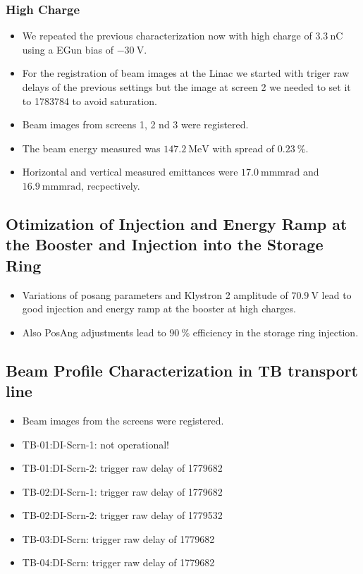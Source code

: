 \documentclass{article}
\begin{document}
\subsubsection{High Charge}
\begin{itemize}
\item We repeated the previous characterization now with high charge of $\SI{3.3}{\nano\coulomb}$ using a EGun bias of $\SI{-30}{\volt}$. 
\item For the registration of beam images at the Linac we started with triger raw delays of the previous settings but the image at screen 2 we needed to set it to 1783784 to avoid saturation.
\item Beam images from screens 1, 2 nd 3 were registered.
\item The beam energy measured was $\SI{147.2}{\mega \electronvolt}$ with spread of $\SI{0.23}{\percent}$.
\item Horizontal and vertical measured emittances were $\SI{17.0}{\milli\meter \milli\radian}$ and $\SI{16.9}{\milli\meter \milli\radian}$, recpectively.
\end{itemize}


\subsection{Otimization of Injection and Energy Ramp at the Booster and Injection into the Storage Ring}
\begin{itemize}
    \item Variations of posang parameters and Klystron 2 amplitude of $\SI{70.9}{\volt}$ lead to good injection and energy ramp at the booster at high charges.
    \item Also PosAng adjustments lead to $\SI{90}{\percent}$ efficiency in the storage ring injection.
\end{itemize}


\subsection{Beam Profile Characterization in TB transport line}
\begin{itemize}
    \item Beam images from the screens were registered.
    \item TB-01:DI-Scrn-1: not operational!
    \item TB-01:DI-Scrn-2: trigger raw delay of 1779682
    \item TB-02:DI-Scrn-1: trigger raw delay of 1779682
    \item TB-02:DI-Scrn-2: trigger raw delay of 1779532
    \item TB-03:DI-Scrn: trigger raw delay of 1779682
    \item TB-04:DI-Scrn: trigger raw delay of 1779682
\end{itemize}
\end{document}
